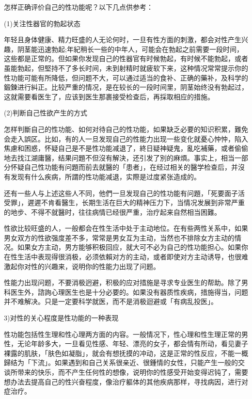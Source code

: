 \documentclass[12pt,UTF8]{ctexbook}
\begin{document}
怎样正确评价自己的性功能呢？以下几点供参考：

(1)关注性器官的勃起状态

年轻且身体健康、精力旺盛的人无论何时，一旦有性方面的刺激，都会对性产生兴趣，阴茎能迅速勃起;年紀稍长一些的中年人，可能会在勃起之前需要一段时间，这些都是正常的。但如果你发现自己的性器官有时候勃起，有时候不能勃起，或者虽能勃起，但堅持不了多长时间，未到射精时就疲软下来，这种情况常常提示你的性功能可能有所降低，但问题不大，可以通过适当的食补、正确的藥补，及科学的鍛鍊进行糾正。比较严重的情况，是在较长的一段时间里，阴茎始终没有勃起过，这就需要看医生了，应该到医生那裹接受检查后，再採取相应的措施。

(2)判断自己性欲产生的方式

怎样判斷自己的性功能、如何对待自己的性功能，如果缺乏必要的知识积累，難免会走入誤区。比如，有的人一旦发现自己的性能力出现一些变化就憂心忡忡，陷入焦慮和困惑，怀疑自己是不是性功能减退了，終日疑神疑鬼，亂吃補藥，或者偷偷地去找江湖庸醫，结果问題不但沒有解決，还引发了別的麻煩。事实上，相当一部分怀疑自己性功能有问題而前去就醫的「患者」，在经过相关的醫学检查后，并沒有发现有什么疾病，所謂的性功能减退，实際是过度紧张造成的。

还有一些人与上述这些人不同，他們一旦发现自己的性功能有问題，「死要面子活受罪」，遲遲不肯看醫生，长期生活在巨大的精神压力下，当情况发展到非常严重的地步、不得不就醫时，往往病情已经很严重，治疗起来自然相当困難。

性欲比较旺盛的人，一般都会在性生活中处于主动地位。在有些两性关系中，如果男女双方的性欲强度差不多，常常是男女互为主动，当然也不排除女方主动的情况。如果女方主动，男方能够积极回应，就大可不必为自己的性功能担心。如果你在性生活中表现得很消极，必须依賴对方的主动，或者即使对方主动诱导，也很难激起你对性的兴趣来，说明你的性能力出现了问题。

性能力出现问题，不要消极迥避，积极的应对措施是寻求专业医生的帮助。除了男科医生外，諮詢心理医生也是十分必要的。如果没有器质性疾病，措施得当，问题并不难解决。只是一定要科学就医，而不是消极迴避或「有病乱投医」。

3)对性的关心程度是性功能的一种表现

性功能包括性生理和性心理两方面的内容。一般情况下，性心理和性生理正常的男性，无论年龄多大，一旦看见性感、年轻、漂亮的女子，都会情有所动，看见妻子裸露的肌肤，「肤色如凝脂」，就会有想抚摸的冲动，这是正常的性反应，不能一概歸结为「下流」。如果遇到和自己关系很亲近、很鍾情的女性，只能产生一般的交谈所带来的快乐，而不产生任何性的想像，说明你的性感受开始变得迟钝了，需要想办法去提高自己的性兴奋程度，像治疗軀体的其他疾病那样，寻找病因，进行对症治疗。
\end{document}
